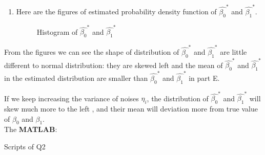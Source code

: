 \documentclass[12pt,letterpaper]{article}
\begin{document}
\begin{enumerate}[label=\textbf{(\Alph*)}]
\begin{enumerate}[label=(\roman*)]
\item	Here are the figures of estimated probability density function of $\hat{\beta_0}^{*}$ and $\hat{\beta_1}^{*}$.
	\begin{figure}[H]
		\centering
		\caption{Histogram of $\hat{\beta_0}^{*}$ and $\hat{\beta_1}^{*}$}
	\end{figure}
\end{enumerate}
From the figures we can see the shape of distribution of $\hat{\beta_0}^{*}$ and $\hat{\beta_1}^{*}$ are little different to normal distribution: they are skewed left and the mean of $\hat{\beta_0}^{*}$ and $\hat{\beta_1}^{*}$ in the estimated distribution are smaller than $\hat{\beta_0}^{*}$ and $\hat{\beta_1}^{*}$ in part E.

If we keep increasing the variance of noises $\eta_i$, the distribution of $\hat{\beta_0}^{*}$ and $\hat{\beta_1}^{*}$ will skew much more to the left , and their mean will deviation more from true value of  $\beta_0$ and $\beta_1$.\\



The \textbf{MATLAB}:

Scripts of Q2
   
\end{enumerate}
\newpage
\end{document}
